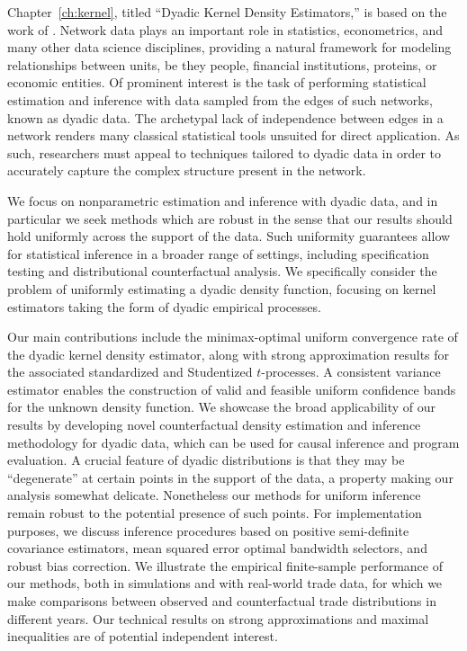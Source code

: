 Chapter~\ref{ch:kernel}, titled ``Dyadic Kernel Density Estimators,'' is based
on the work of \citet{cattaneo2024uniform}. Network data plays an important role
in statistics, econometrics, and many other data science disciplines, providing
a natural framework for modeling relationships between units, be they people,
financial institutions, proteins, or economic entities. Of prominent interest
is the task of performing statistical estimation and inference with data
sampled from the edges of such networks, known as dyadic data. The archetypal
lack of independence between edges in a network renders many classical
statistical tools unsuited for direct application. As such, researchers must
appeal to techniques tailored to dyadic data in order to accurately capture the
complex structure present in the network.

We focus on nonparametric estimation and inference with dyadic
data, and in particular we seek methods which are robust in the sense that our
results should hold uniformly across the support of the data. Such uniformity
guarantees allow for statistical inference in a broader range of settings,
including specification testing and distributional counterfactual analysis. We
specifically consider the problem of uniformly estimating a dyadic
density function, focusing on kernel estimators taking the form of dyadic
empirical processes.

Our main contributions include the minimax-optimal uniform convergence rate of
the dyadic kernel density estimator, along with strong approximation results
for the associated standardized and Studentized $t$-processes. A consistent
variance estimator enables the construction of valid and feasible uniform
confidence bands for the unknown density function. We showcase the broad
applicability of our results by developing novel counterfactual density
estimation and inference methodology for dyadic data, which can be used for
causal inference and program evaluation.
A crucial feature of dyadic distributions is that they may be ``degenerate'' at
certain points in the support of the data, a property making our analysis
somewhat delicate. Nonetheless our methods for uniform inference remain robust
to the potential presence of such points.
For implementation purposes, we discuss inference procedures based on positive
semi-definite covariance estimators, mean squared error optimal bandwidth
selectors, and robust bias correction. We illustrate the empirical
finite-sample performance of our methods, both in simulations and with
real-world trade data, for which we make comparisons between observed and
counterfactual trade distributions in different years. Our technical results
on strong approximations and maximal inequalities are of potential
independent interest.

